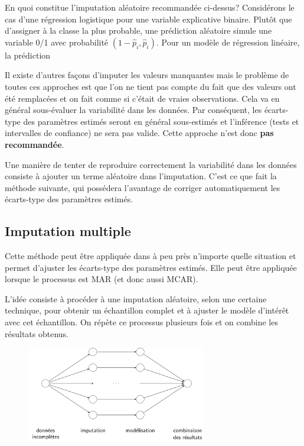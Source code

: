 \documentclass[
  11pt,
  letterpaper,
]{scrbook}
\theoremstyle{definition}
\theoremstyle{remark}
\begin{document}
En quoi constitue l'imputation aléatoire recommandée ci-dessus?
Considérons le cas d'une régression logistique pour une variable
explicative binaire. Plutôt que d'assigner à la classe la plus probable,
une prédiction aléatoire simule une variable 0/1 avec probabilité
\((1-\widehat{p}_i, \widehat{p}_i)\). Pour un modèle de régression
linéaire, la prédiction

Il existe d'autres façons d'imputer les valeurs manquantes mais le
problème de toutes ces approches est que l'on ne tient pas compte du
fait que des valeurs ont été remplacées et on fait comme si c'était de
vraies observations. Cela va en général sous-évaluer la variabilité dans
les données. Par conséquent, les écarts-type des paramètres estimés
seront en général sous-estimés et l'inférence (tests et intervalles de
confiance) ne sera pas valide. Cette approche n'est donc \textbf{pas
recommandée}.

Une manière de tenter de reproduire correctement la variabilité dans les
données consiste à ajouter un terme aléatoire dans l'imputation. C'est
ce que fait la méthode suivante, qui possédera l'avantage de corriger
automatiquement les écarts-type des paramètres estimés.

\hypertarget{imputation-multiple}{%
\subsection{Imputation multiple}\label{imputation-multiple}}

Cette méthode peut être appliquée dans à peu près n'importe quelle
situation et permet d'ajuster les écarts-type des paramètres estimés.
Elle peut être appliquée lorsque le processus est MAR (et donc aussi
MCAR).

L'idée consiste à procéder à une imputation aléatoire, selon une
certaine technique, pour obtenir un échantillon complet et à ajuster le
modèle d'intérêt avec cet échantillon. On répète ce processus plusieurs
fois et on combine les résultats obtenus.

\begin{figure}[ht!]

{\centering \includegraphics[width=0.7\textwidth,height=\textheight]{./figures/donnees_manquantes_workflow.png}

}

\end{figure}
\end{document}
